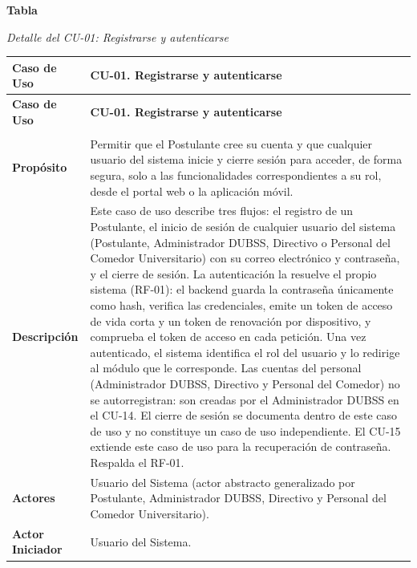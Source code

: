 \label{tab:detalle_cu01}
\noindent\textbf{Tabla~\thetable}\par\nopagebreak
\noindent\textit{Detalle del CU-01: Registrarse y autenticarse}\par\nopagebreak
\begingroup\small\linespread{1}\selectfont
\begin{longtable}{>{\raggedright\arraybackslash}p{2.9cm} >{\raggedright\arraybackslash}p{12.6cm}}
\toprule
\textbf{Caso de Uso} & \textbf{CU-01. Registrarse y autenticarse} \\
\midrule
\endfirsthead
\toprule
\textbf{Caso de Uso} & \textbf{CU-01. Registrarse y autenticarse} \\
\midrule
\endhead
\endfoot
\bottomrule
\multicolumn{2}{l}{\textit{Nota.} Elaboración propia.} \\
\endlastfoot
\textbf{Propósito} & Permitir que el Postulante cree su cuenta y que cualquier usuario del sistema inicie y cierre sesión para acceder, de forma segura, solo a las funcionalidades correspondientes a su rol, desde el portal web o la aplicación móvil. \\
\midrule
\textbf{Descripción} & Este caso de uso describe tres flujos: el registro de un Postulante, el inicio de sesión de cualquier usuario del sistema (Postulante, Administrador DUBSS, Directivo o Personal del Comedor Universitario) con su correo electrónico y contraseña, y el cierre de sesión. La autenticación la resuelve el propio sistema (RF-01): el backend guarda la contraseña únicamente como hash, verifica las credenciales, emite un token de acceso de vida corta y un token de renovación por dispositivo, y comprueba el token de acceso en cada petición. Una vez autenticado, el sistema identifica el rol del usuario y lo redirige al módulo que le corresponde. Las cuentas del personal (Administrador DUBSS, Directivo y Personal del Comedor) no se autorregistran: son creadas por el Administrador DUBSS en el CU-14. El cierre de sesión se documenta dentro de este caso de uso y no constituye un caso de uso independiente. El CU-15 extiende este caso de uso para la recuperación de contraseña. Respalda el RF-01. \\
\midrule
\textbf{Actores} & Usuario del Sistema (actor abstracto generalizado por Postulante, Administrador DUBSS, Directivo y Personal del Comedor Universitario). \\
\midrule
\textbf{Actor Iniciador} & Usuario del Sistema. \\

\end{longtable}
